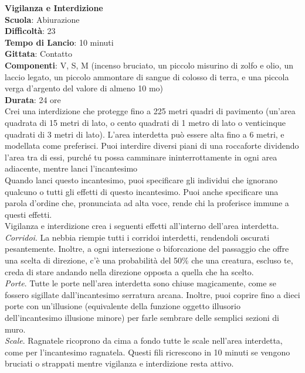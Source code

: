 \begin{multicols}{2}
\medskip\textbf{Vigilanza e Interdizione}\\
\textbf{Scuola}: Abiurazione\\
\textbf{Difficoltà}: 23\\
\textbf{Tempo di Lancio}: 10 minuti\\
\textbf{Gittata}: Contatto\\
\textbf{Componenti}: V, S, M (incenso bruciato, un piccolo misurino di zolfo e olio, un laccio legato, un piccolo ammontare di sangue di colosso di terra, e una piccola verga d'argento del valore di almeno 10 mo)\\
\textbf{Durata}: 24 ore\\
Crei una interdizione che protegge fino a 225 metri quadri di pavimento (un'area quadrata di 15 metri di lato, o cento quadrati di 1 metro di lato o venticinque quadrati di 3 metri di lato). L'area interdetta può essere alta fino a 6 metri, e modellata come preferisci. Puoi interdire diversi piani di una roccaforte dividendo l'area tra di essi, purché tu possa camminare ininterrottamente in ogni area adiacente, mentre lanci l'incantesimo\\
Quando lanci questo incantesimo, puoi specificare gli individui che ignorano qualcuno o tutti gli effetti di questo incantesimo. Puoi anche specificare una parola d'ordine che, pronunciata ad alta voce, rende chi la proferisce immune a questi effetti.\\
Vigilanza e interdizione crea i seguenti effetti all'interno dell'area interdetta.\\
\textit{Corridoi}. La nebbia riempie tutti i corridoi interdetti, rendendoli oscurati pesantemente. Inoltre, a ogni intersezione o biforcazione del passaggio che offre una scelta di direzione, c'è una probabilità del 50\% che una creatura, escluso te, creda di stare andando nella direzione opposta a quella che ha scelto.\\
\textit{Porte}. Tutte le porte nell'area interdetta sono chiuse magicamente, come se fossero sigillate dall'incantesimo serratura arcana. Inoltre, puoi coprire fino a dieci porte con un'illusione (equivalente della funzione oggetto illusorio dell'incantesimo illusione minore) per farle sembrare delle semplici sezioni di muro.\\
\textit{Scale}. Ragnatele ricoprono da cima a fondo tutte le scale nell'area interdetta, come per l'incantesimo ragnatela. Questi fili ricrescono in 10 minuti se vengono bruciati o strappati mentre vigilanza e interdizione resta attivo.\\

\end{multicols}
